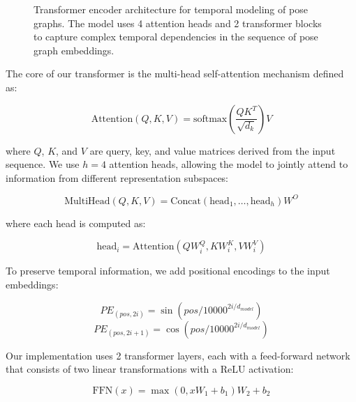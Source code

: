 \documentclass[conference]{IEEEtran}
\begin{document}
\begin{figure*}[htbp]
\begin{adjustbox}{max width=\textwidth}
    \end{adjustbox}
    \caption{Transformer encoder architecture for temporal modeling of pose graphs. The model uses 4 attention heads and 2 transformer blocks to capture complex temporal dependencies in the sequence of pose graph embeddings.}
    \label{fig:transformer}
\end{figure*}

The core of our transformer is the multi-head self-attention mechanism defined
as:

\begin{equation}
    \text{Attention}(Q, K, V) = \text{softmax}\left(\frac{QK^T}{\sqrt{d_k}}\right)V
\end{equation}

where $Q$, $K$, and $V$ are query, key, and value matrices derived from the
input sequence. We use $h=4$ attention heads, allowing the model to jointly
attend to information from different representation subspaces:

\begin{equation}
    \text{MultiHead}(Q, K, V) = \text{Concat}(\text{head}_1, \ldots, \text{head}_h)W^O
\end{equation}

where each head is computed as:

\begin{equation}
    \text{head}_i = \text{Attention}(QW_i^Q, KW_i^K, VW_i^V)
\end{equation}

To preserve temporal information, we add positional encodings to the input
embeddings:

\begin{equation}
    PE_{(pos, 2i)} = \sin(pos/10000^{2i/d_{model}})
\end{equation}
\begin{equation}
    PE_{(pos, 2i+1)} = \cos(pos/10000^{2i/d_{model}})
\end{equation}

Our implementation uses 2 transformer layers, each with a feed-forward network
that consists of two linear transformations with a ReLU activation:

\begin{equation}
    \text{FFN}(x) = \max(0, xW_1 + b_1)W_2 + b_2
\end{equation}
\end{document}
